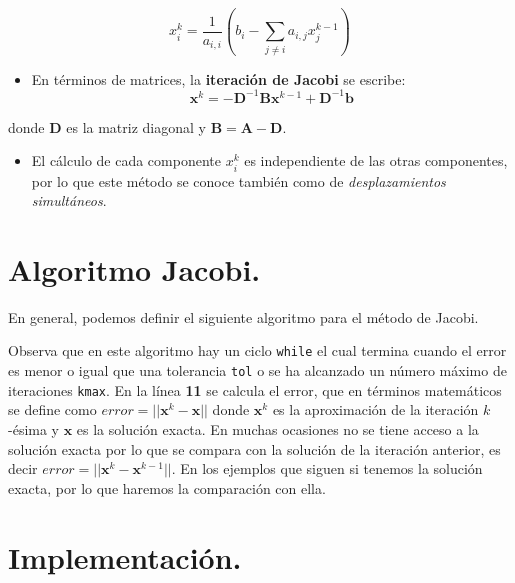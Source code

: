 \documentclass[
  letterpaper,
  DIV=11,
  numbers=noendperiod]{scrreprt}
\providecommand{\tightlist}{%
  \setlength{\itemsep}{0pt}\setlength{\parskip}{0pt}}\usepackage{longtable,booktabs,array}
\begin{document}
\[
x_i^k = \frac{1}{a_{i,i}} \left(b_i -  \sum_{j \neq i} a_{i,j} x_j^{k-1} \right)
\]

\begin{itemize}
\tightlist
\item
  En términos de matrices, la \textbf{iteración de Jacobi} se escribe:
  \[
  \mathbf{x}^k = -\mathbf{D}^{-1} \mathbf{B}\mathbf{x}^{k-1} + \mathbf{D}^{-1} \mathbf{b}
  \]
\end{itemize}

donde \(\mathbf{D}\) es la matriz diagonal y
\(\mathbf{B} = \mathbf{A} - \mathbf{D}\).

\begin{itemize}
\tightlist
\item
  El cálculo de cada componente \(x_i^k\) es independiente de las otras
  componentes, por lo que este método se conoce también como de
  \emph{desplazamientos simultáneos}.
\end{itemize}

\section{Algoritmo Jacobi.}\label{algoritmo-jacobi.}

En general, podemos definir el siguiente algoritmo para el método de
Jacobi.

Observa que en este algoritmo hay un ciclo \texttt{while} el cual
termina cuando el error es menor o igual que una tolerancia \texttt{tol}
o se ha alcanzado un número máximo de iteraciones \texttt{kmax}. En la
línea \textbf{11} se calcula el error, que en términos matemáticos se
define como \(error = || \mathbf{x}^k - \mathbf{x}||\) donde
\(\mathbf{x}^k\) es la aproximación de la iteración \(k\)-ésima y
\(\mathbf{x}\) es la solución exacta. En muchas ocasiones no se tiene
acceso a la solución exacta por lo que se compara con la solución de la
iteración anterior, es decir
\(error = || \mathbf{x}^k - \mathbf{x}^{k-1}||\). En los ejemplos que
siguen si tenemos la solución exacta, por lo que haremos la comparación
con ella.

\section{Implementación.}\label{implementaciuxf3n.-1}
\end{document}
